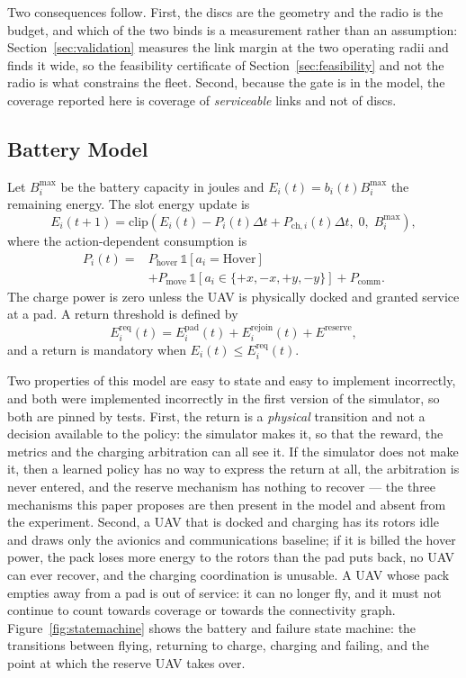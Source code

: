 \documentclass[conference]{IEEEtran}
\begin{document}
Two consequences follow. First, the discs are the geometry and the radio is the budget, and which of the two binds is a measurement rather than an assumption: Section~\ref{sec:validation} measures the link margin at the two operating radii and finds it wide, so the feasibility certificate of Section~\ref{sec:feasibility} and not the radio is what constrains the fleet. Second, because the gate is in the model, the coverage reported here is coverage of \emph{serviceable} links and not of discs.

\subsection{Battery Model}
Let $B_i^{\max}$ be the battery capacity in joules and $E_i(t)=b_i(t)B_i^{\max}$ the remaining energy. The slot energy update is
\begin{equation}
E_i(t+1)=\mathrm{clip}\!\left(E_i(t)-P_i(t)\Delta t+P_{\mathrm{ch},i}(t)\Delta t,\;0,\;B_i^{\max}\right),
\label{eq:battery}
\end{equation}
where the action-dependent consumption is
\begin{equation}
\begin{split}
P_i(t)={}&P_{\mathrm{hover}}\,\mathbb 1[a_i=\mathrm{Hover}]\\
&+P_{\mathrm{move}}\,\mathbb 1[a_i\in\{+x,-x,+y,-y\}]+P_{\mathrm{comm}}.
\end{split}
\label{eq:power}
\end{equation}
The charge power is zero unless the UAV is physically docked and granted service at a pad. A return threshold is defined by
\begin{equation}
E_i^{\mathrm{req}}(t)=E_i^{\mathrm{pad}}(t)+E_i^{\mathrm{rejoin}}(t)+E^{\mathrm{reserve}},
\label{eq:ereq}
\end{equation}
and a return is mandatory when $E_i(t)\le E_i^{\mathrm{req}}(t)$.

Two properties of this model are easy to state and easy to implement incorrectly, and both were implemented incorrectly in the first version of the simulator, so both are pinned by tests. First, the return is a \emph{physical} transition and not a decision available to the policy: the simulator makes it, so that the reward, the metrics and the charging arbitration can all see it. If the simulator does not make it, then a learned policy has no way to express the return at all, the arbitration is never entered, and the reserve mechanism has nothing to recover --- the three mechanisms this paper proposes are then present in the model and absent from the experiment. Second, a UAV that is docked and charging has its rotors idle and draws only the avionics and communications baseline; if it is billed the hover power, the pack loses more energy to the rotors than the pad puts back, no UAV can ever recover, and the charging coordination is unusable. A UAV whose pack empties away from a pad is out of service: it can no longer fly, and it must not continue to count towards coverage or towards the connectivity graph. Figure~\ref{fig:statemachine} shows the battery and failure state machine: the transitions between flying, returning to charge, charging and failing, and the point at which the reserve UAV takes over.
\end{document}

